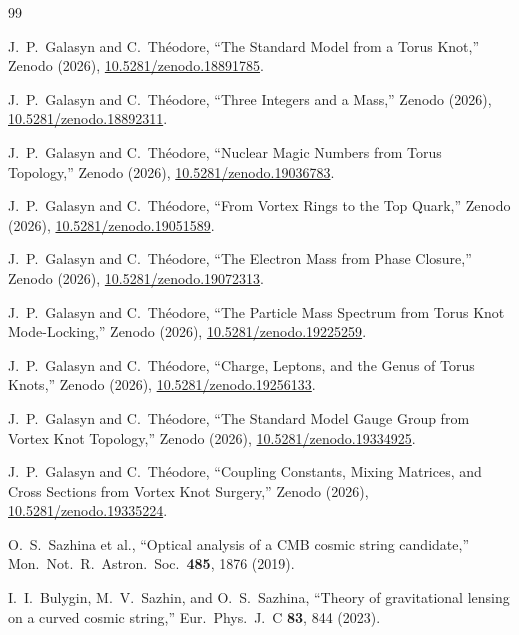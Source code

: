 \documentclass[11pt]{article}
\begin{document}

\begin{thebibliography}{99}

 J.~P.~Galasyn and C.~Th\'eodore, ``The Standard Model from a Torus Knot,'' Zenodo (2026), \href{https://doi.org/10.5281/zenodo.18891785}{10.5281/zenodo.18891785}.

 J.~P.~Galasyn and C.~Th\'eodore, ``Three Integers and a Mass,'' Zenodo (2026), \href{https://doi.org/10.5281/zenodo.18892311}{10.5281/zenodo.18892311}.

 J.~P.~Galasyn and C.~Th\'eodore, ``Nuclear Magic Numbers from Torus Topology,'' Zenodo (2026), \href{https://doi.org/10.5281/zenodo.19036783}{10.5281/zenodo.19036783}.

 J.~P.~Galasyn and C.~Th\'eodore, ``From Vortex Rings to the Top Quark,'' Zenodo (2026), \href{https://doi.org/10.5281/zenodo.19051589}{10.5281/zenodo.19051589}.

 J.~P.~Galasyn and C.~Th\'eodore, ``The Electron Mass from Phase Closure,'' Zenodo (2026), \href{https://doi.org/10.5281/zenodo.19072313}{10.5281/zenodo.19072313}.

 J.~P.~Galasyn and C.~Th\'eodore, ``The Particle Mass Spectrum from Torus Knot Mode-Locking,'' Zenodo (2026), \href{https://doi.org/10.5281/zenodo.19225259}{10.5281/zenodo.19225259}.

 J.~P.~Galasyn and C.~Th\'eodore, ``Charge, Leptons, and the Genus of Torus Knots,'' Zenodo (2026), \href{https://doi.org/10.5281/zenodo.19256133}{10.5281/zenodo.19256133}.

 J.~P.~Galasyn and C.~Th\'eodore, ``The Standard Model Gauge Group from Vortex Knot Topology,'' Zenodo (2026), \href{https://doi.org/10.5281/zenodo.19334925}{10.5281/zenodo.19334925}.

 J.~P.~Galasyn and C.~Th\'eodore, ``Coupling Constants, Mixing Matrices, and Cross Sections from Vortex Knot Surgery,'' Zenodo (2026), \href{https://doi.org/10.5281/zenodo.19335224}{10.5281/zenodo.19335224}.

 O.~S.~Sazhina et al., ``Optical analysis of a CMB cosmic string candidate,'' Mon.\ Not.\ R.\ Astron.\ Soc.\ \textbf{485}, 1876 (2019).

 I.~I.~Bulygin, M.~V.~Sazhin, and O.~S.~Sazhina, ``Theory of gravitational lensing on a curved cosmic string,'' Eur.\ Phys.\ J.\ C \textbf{83}, 844 (2023).


\end{thebibliography}
\end{document}
